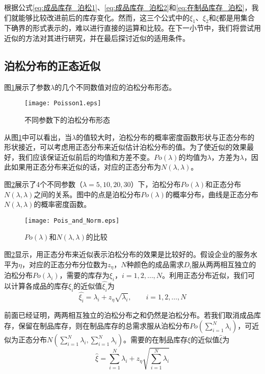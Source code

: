 根据公式\ref{eq:成品库存_泊松1}、\ref{eq:成品库存_泊松2}和\ref{eq:在制品库存_泊松}，我们就能够比较改进前后的库存变化。然而，这三个公式中的$\xi_1$、$\xi_2$和$\xi$都是用集合下确界的形式表示的，难以进行直接的运算和比较。在下一小节中，我们将尝试用近似的方法对其进行研究，并在最后探讨近似的适用条件。




\subsection{泊松分布的正态近似}

图\ref{fig:泊松分布形态}展示了参数$\lambda$的几个不同数值对应的泊松分布形态。

\begin{figure}[htbp]
\centering
\texttt{[image: Poisson1.eps]}
\caption{不同参数下的泊松分布形态}
\label{fig:泊松分布形态}
\end{figure}

从图\ref{fig:泊松分布形态}中可以看出，当$\lambda$的值较大时，泊松分布的概率密度函数形状与正态分布的形状接近，可以考虑用正态分布来近似估计泊松分布的值。为了使近似的效果最好，我们应该保证近似前后的均值和方差不变。$Po(\lambda)$的均值为$\lambda$，方差为$\lambda$，因此如果用正态分布来近似的话，对应的正态分布为$N(\lambda,\lambda)$。

图\ref{fig:泊松分布和正态分布的比较}展示了4个不同参数（$\lambda=5,10,20,30$）下，泊松分布$Po(\lambda)$和正态分布$N(\lambda,\lambda)$之间的关系。图中的点是泊松分布$Po(\lambda)$的概率分布，曲线是正态分布$N(\lambda,\lambda)$的概率密度函数。

\begin{figure}[htb]
\centering
\texttt{[image: Pois\_and\_Norm.eps]}
\caption{$Po(\lambda)$和$N(\lambda,\lambda)$的比较}
\label{fig:泊松分布和正态分布的比较}
\end{figure}

图\ref{fig:泊松分布和正态分布的比较}显示，用正态分布来近似表示泊松分布的效果是比较好的。假设企业的服务水平为$\eta$，对应的正态分布分位数为$z_\eta$，$N$种颜色的成品需求$D_i$服从两两相互独立的泊松分布$Po(\lambda_i)$，需要的库存为$\xi_i$，$i=1,2,\ldots,N$。利用正态分布近似，我们可以计算各成品的库存$\xi_i$的近似值$\hat{\xi_i}$为
\begin{equation}
\hat{\xi_i} = \lambda_i + z_\eta\sqrt{\lambda_i},\qquad i=1,2,\ldots,N
\label{eq:正态近似下的成品库存}
\end{equation}

前面已经证明，两两相互独立的泊松分布之和仍然是泊松分布。若我们取消成品库存，保留在制品库存，则在制品库存的总需求服从泊松分布$Po(\sum_{i=1}^N\lambda_i)$，可近似为正态分布$N(\sum_{i=1}^N\lambda_i,\sum_{i=1}^N\lambda_i)$。需要的在制品库存$\xi$的近似值$\hat{\xi}$为
\begin{equation}
\hat{\xi} = \sum_{i=1}^N\lambda_i + z_\eta\sqrt{\sum_{i=1}^N\lambda_i}
\label{eq:正态近似下的在制品库存}
\end{equation}

